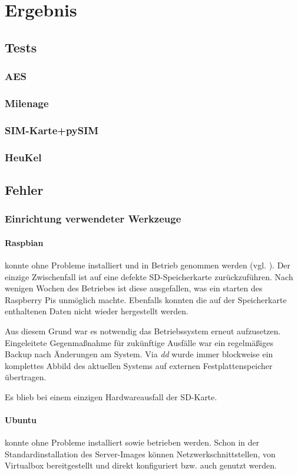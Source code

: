 \section{Ergebnis}
	\subsection{Tests}
		\subsubsection{AES}
		\subsubsection{Milenage}
		\subsubsection{SIM-Karte+pySIM}
		\subsubsection{HeuKel}
	\subsection{Fehler}
		\subsubsection{Einrichtung verwendeter Werkzeuge}
			\paragraph{Raspbian} konnte ohne Probleme installiert und in
			Betrieb genommen werden (vgl. ). Der einzige Zwischenfall ist auf eine
			defekte SD-Speicherkarte zurückzuführen. Nach wenigen Wochen
			des Betriebes ist diese ausgefallen, was ein starten des
			Raspberry Pis unmöglich machte. Ebenfalls konnten die auf der
			Speicherkarte enthaltenen Daten nicht wieder hergestellt werden.

			Aus diesem Grund war es notwendig das Betriebssystem erneut aufzusetzen.
			Eingeleitete Gegenmaßnahme für zukünftige Ausfälle war ein regelmäßiges Backup
			nach Änderungen am System. Via \textit{dd} wurde immer blockweise ein komplettes Abbild
			des aktuellen Systems auf externen Festplattenspeicher übertragen.

			Es blieb bei einem einzigen Hardwareausfall der SD-Karte.

			\paragraph{Ubuntu} konnte ohne Probleme installiert sowie betrieben werden.
			Schon in der Standardinstallation des Server-Images können Netzwerkschnittstellen,
			von Virtualbox bereitgestellt und direkt konfiguriert bzw. auch genutzt werden.

